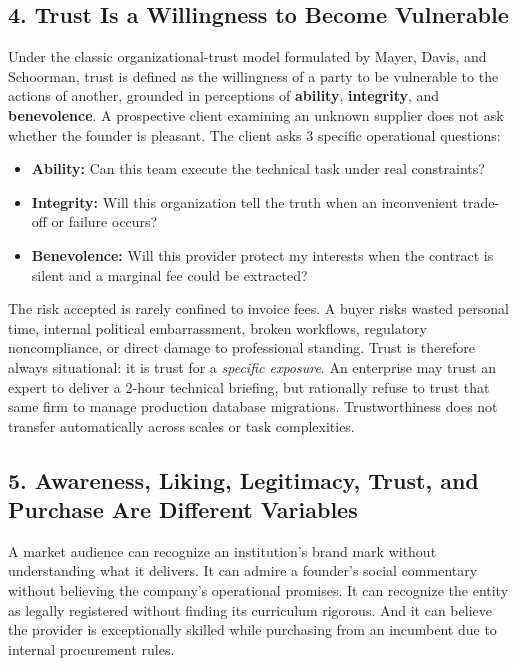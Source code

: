 \subsection*{4. Trust Is a Willingness to Become Vulnerable}

Under the classic organizational-trust model formulated by Mayer, Davis, and Schoorman, trust is defined as the willingness of a party to be vulnerable to the actions of another, grounded in perceptions of \textbf{ability}, \textbf{integrity}, and \textbf{benevolence}. A prospective client examining an unknown supplier does not ask whether the founder is pleasant. The client asks 3 specific operational questions:
\begin{itemize}
\item \textbf{Ability:} Can this team execute the technical task under real constraints?
\item \textbf{Integrity:} Will this organization tell the truth when an inconvenient trade-off or failure occurs?
\item \textbf{Benevolence:} Will this provider protect my interests when the contract is silent and a marginal fee could be extracted?
\end{itemize}

The risk accepted is rarely confined to invoice fees. A buyer risks wasted personal time, internal political embarrassment, broken workflows, regulatory noncompliance, or direct damage to professional standing. Trust is therefore always situational: it is trust for a \emph{specific exposure}. An enterprise may trust an expert to deliver a 2-hour technical briefing, but rationally refuse to trust that same firm to manage production database migrations. Trustworthiness does not transfer automatically across scales or task complexities.

\subsection*{5. Awareness, Liking, Legitimacy, Trust, and Purchase Are Different Variables}

A market audience can recognize an institution's brand mark without understanding what it delivers. It can admire a founder's social commentary without believing the company's operational promises. It can recognize the entity as legally registered without finding its curriculum rigorous. And it can believe the provider is exceptionally skilled while purchasing from an incumbent due to internal procurement rules. 

